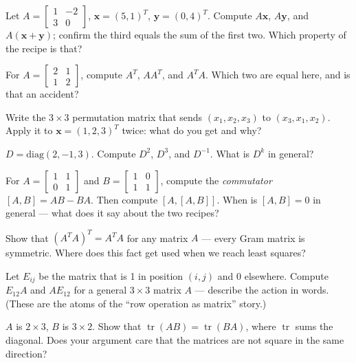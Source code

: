 \begin{exercise}[easy]
Let $A=\begin{bmatrix}1&-2\\3&0\end{bmatrix}$, $\mathbf{x}=(5,1)^{T}$, $\mathbf{y}=(0,4)^{T}$. Compute $A\mathbf{x}$, $A\mathbf{y}$, and $A(\mathbf{x}+\mathbf{y})$; confirm the third equals the sum of the first two. Which property of the recipe is that?
\end{exercise}
\begin{exercise}[easy]
For $A=\begin{bmatrix}2&1\\1&2\end{bmatrix}$, compute $A^{T}$, $AA^{T}$, and $A^{T}A$. Which two are equal here, and is that an accident?
\end{exercise}
\begin{exercise}[easy]
Write the $3\times3$ permutation matrix that sends $(x_1,x_2,x_3)$ to $(x_3,x_1,x_2)$. Apply it to $\mathbf{x}=(1,2,3)^{T}$ twice: what do you get and why?
\end{exercise}
\begin{exercise}[easy]
$D=\mathrm{diag}(2,-1,3)$. Compute $D^2$, $D^3$, and $D^{-1}$. What is $D^k$ in general?
\end{exercise}
\begin{exercise}[medium]
For $A=\begin{bmatrix}1&1\\0&1\end{bmatrix}$ and $B=\begin{bmatrix}1&0\\1&1\end{bmatrix}$, compute the \emph{commutator} $[A,B]=AB-BA$. Then compute $[A,[A,B]]$. When is $[A,B]=0$ in general — what does it say about the two recipes?
\end{exercise}
\begin{exercise}[medium]
Show that $(A^{T}A)^{T}=A^{T}A$ for any matrix $A$ — every Gram matrix is symmetric. Where does this fact get used when we reach least squares?
\end{exercise}
\begin{exercise}[medium]
Let $E_{ij}$ be the matrix that is 1 in position $(i,j)$ and 0 elsewhere. Compute $E_{12}A$ and $AE_{12}$ for a general $3\times3$ matrix $A$ — describe the action in words. (These are the atoms of the ``row operation as matrix'' story.)
\end{exercise}
\begin{exercise}
$A$ is $2\times3$, $B$ is $3\times2$. Show that $\operatorname{tr}(AB)=\operatorname{tr}(BA)$, where $\operatorname{tr}$ sums the diagonal. Does your argument care that the matrices are not square in the same direction?
\end{exercise}
